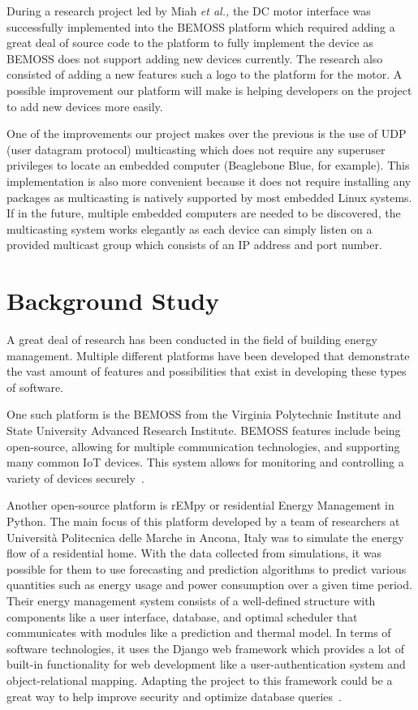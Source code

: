 During a research project led by Miah \textit{et al.,} the DC motor interface was successfully
implemented into the BEMOSS platform which required adding a great deal of source code
to the platform to fully implement the device as BEMOSS does not support adding
new devices currently. The research also consisted of adding a new
features such a logo to the
platform for the motor. A possible improvement our platform will make is helping
developers on the project to add new devices more easily.

One of the improvements our project makes over the previous is the use of UDP (user datagram protocol) multicasting which does not require any superuser privileges to locate an
embedded computer (Beaglebone Blue, for example). This implementation is also more convenient
because it does not require installing any packages as multicasting is natively
supported by most embedded Linux systems. If in the future, multiple embedded
computers are needed to be discovered, the multicasting system works elegantly
as each device can simply listen on a provided multicast group which consists of
an IP address and port number.

\section{Background Study}
A great deal of research has been conducted in the field of building energy management. Multiple different platforms have been developed that demonstrate the vast amount of features and possibilities that exist in developing these types of software.

One such platform is the BEMOSS from the Virginia Polytechnic Institute and State
University Advanced Research Institute. BEMOSS features include being
open-source, allowing for multiple communication technologies, and supporting
many common IoT devices. This system allows for monitoring and controlling a
variety of devices securely~\cite{BEMOSS}.

Another open-source platform is rEMpy or residential Energy Management in
Python. The main focus of this platform developed by a team of researchers at
Universit\`{a} Politecnica delle Marche in Ancona, Italy was to simulate the
energy flow of a residential home. With the data collected from simulations, it
was possible for them to use forecasting and prediction algorithms to predict
various quantities such as energy usage and power consumption over a given time period. Their energy management system consists of a well-defined structure with components like a user interface, database, and optimal scheduler that communicates with modules like a prediction and thermal model. In terms of software technologies, it uses the Django web framework which provides a lot of built-in functionality for web development like a user-authentication system and object-relational mapping. Adapting the project to this framework could be a great way to help improve security and optimize database queries~\cite{fagiani2017}.

